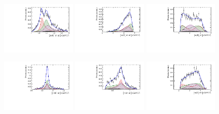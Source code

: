 \begin{figure}[h]
	\centering
		\includegraphics[width=0.32\textwidth, height = !]{figs/lassoFit/LASSO/m_Kpipi_mod.pdf} 
		\includegraphics[width=0.32\textwidth, height = !]{figs/lassoFit/LASSO/m_Dspipi_mod.pdf} 
		\includegraphics[width=0.32\textwidth, height = !]{figs/lassoFit/LASSO/m_Dspim_mod.pdf} 

		\includegraphics[width=0.32\textwidth, height = !]{figs/lassoFit/LASSO/m_Kpi_mod.pdf} 
		\includegraphics[width=0.32\textwidth, height = !]{figs/lassoFit/LASSO/m_pipi_mod.pdf} 
		\includegraphics[width=0.32\textwidth, height = !]{figs/lassoFit/LASSO/m_Dspi_mod.pdf} 
		

\end{figure}
